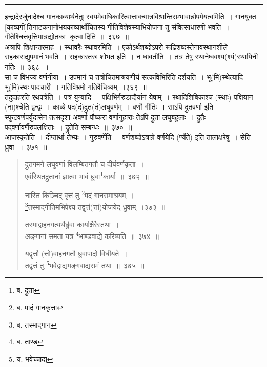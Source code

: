 \documentclass[11pt, openany]{book}
\begin{document}
\hrule

\vspace{2mm}
\noindent
{\qtt इन्द्रादेरर्जुनादेश्च} गानकाव्यार्थनेतुः स्वयमेवाधिकारित्वात्तावन्मात्रविश्रान्तिसम्भावान्नोपमेयत्वमिति~। गानयुक्त [काव्यगी]तिनाटकगानोभयकाव्यार्थोचितस्य गीतिविशेषस्याभियोजना तु संवित्साधारणी भवति~। गीतेश्चित्तवृत्तिमात्रद्योतका [कृत्वा]दिति~॥~३६७~॥\\

अत्रापि शिक्षान्तरमाह~। {\qtt स्थावरैः स्थावर}मिति~। एकोऽर्थशब्दोऽपरो रूढिशब्दस्तेनावस्थानशीले सहकाराद्युपमानं भवति~। {\qtt सहकारतरुः} शोभत इति~। न धावतीति~। तत्र तेषु स्थानेष्ववश्य(श्यं)स्थायिनी गतिः~॥~३६८~॥\\

सा च विभज्य वर्णनीया~। उपमानं च तत्रोचितमाश्रयणीयं सत्कविभिरिति दर्शयति~। भू(मि)स्थेत्यादि~। भू(मि)स्थः पादचारी~। {\qtt गतिविभ्रमो} गतिवैचित्र्यम्~।३६९~॥\\

तदुदाहरति {\qtt रथपत्रेति}~। पत्रं युग्यादि~। पक्षिभिर्गरुडाद्यैर्यानं येषाम्~। रथादिशिबिकाश्च (स्थाः) पक्षियान (ना)श्चेति द्वन्द्वः~। काव्ये पद(दं)द्रुत(तं)लघुवर्णम्~। वर्णो गीतिः~। साऽपि द्रुतवर्णा इति~। स्फुटवर्णपर्युदासेन तत्सदृशा अवर्णा पौष्करा वर्णानुहाराः तेऽपि द्रुता लघुबहुलाः~। द्रुतैः {\qtt पदवर्णावर्णै}रुपलक्षिताः~। द्रुतेति सम्बन्धः~॥~३७०~॥\\

{\qtt आजस्कृतेति}~। दीप्तार्था तेभ्यः~। {\qtt गुरुवर्णेति}~। वर्णशब्दोऽत्राग्रे वर्णयेदि (र्ण्येते) इति तालाक्षरेषु~। सेति ध्रुवा~॥~३७१~॥

\newpage

\begin{quote}
{\na द्रुतगमने लघुवर्णा विलम्बितगतौ च दीर्घवर्णकृता~। \\
 एवंस्थितद्रुतानां ज्ञात्वा भावं ध्रुवा\renewcommand{\thefootnote}{1}\footnote{ब. द्रुता}कार्या~॥~३७२~॥

 नास्ति किंञ्चिद् वृत्तं तु \renewcommand{\thefootnote}{2}\footnote{ब. पादं गानकृत्ता}पदं गानसमाश्रयम्~।\\
 \renewcommand{\thefootnote}{3}\footnote{ब. तस्माद्गान}तस्माद्गीतिमभिप्रेक्ष्य तद्वृत्तं(त्तां)योजयेद् ध्रुवाम्~।३७३~॥

 तस्माद्वाहनगत्यर्थैर्ध्रुवा कार्याक्षैरैस्तथा~।\\
 अङ्गानां समता यत्र \renewcommand{\thefootnote}{4}\footnote{ब. ताण्ड}भाण्डवाद्ये करिष्यति~॥~३७४~॥

 यद्वृत्तौ (त्तो)वाहनगतौ ध्रुवापादो विधीयते~।\\
 तद्वृत्तं तु \renewcommand{\thefootnote}{5}\footnote{य. भवेच्चाद्य}भवेद्वाद्यमङ्गवाद्यसमं तथा~॥~३७५~॥}
\end{quote}
\end{document}
